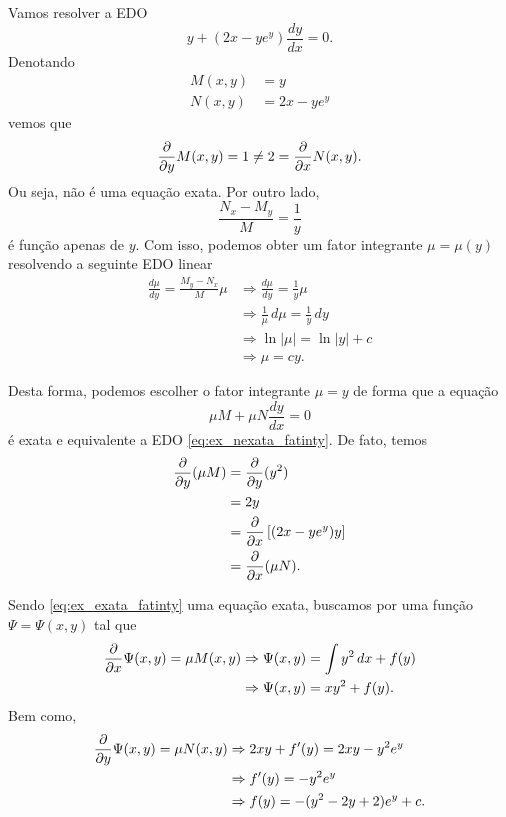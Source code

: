 \begin{ex}
  Vamos resolver a EDO
  \begin{equation}\label{eq:ex_nexata_fatinty}
    y + (2x - ye^y)\frac{dy}{dx} = 0.
  \end{equation}
  Denotando
  \begin{align}
    M(x,y) &= y \\
    N(x,y) &= 2x - ye^y
  \end{align}
  vemos que
  \begin{equation}
    \frac{\partial}{\partial y}M(x,y) = 1 \neq 2 = \frac{\partial}{\partial x}N(x,y).
  \end{equation}
  Ou seja, não é uma equação exata. Por outro lado,
  \begin{equation}
    \frac{N_x-M_y}{M} = \frac{1}{y}
  \end{equation}
  é função apenas de $y$. Com isso, podemos obter um fator integrante $\mu = \mu(y)$ resolvendo a seguinte EDO linear
  \begin{align}
    \frac{d\mu}{dy} = \frac{M_y-N_x}{M}\mu &\Rightarrow \frac{d\mu}{dy} = \frac{1}{y}\mu \\
    &\Rightarrow \frac{1}{\mu}\,d\mu = \frac{1}{y}\,dy \\
    &\Rightarrow \ln|\mu| = \ln|y| + c \\
    &\Rightarrow \mu = cy.
  \end{align}

  Desta forma, podemos escolher o fator integrante $\mu = y$ de forma que a equação
  \begin{equation}\label{eq:ex_exata_fatinty}
    \mu M + \mu N\frac{dy}{dx} = 0
  \end{equation}
  é exata e equivalente a EDO \eqref{eq:ex_nexata_fatinty}. De fato, temos
  \begin{align}
    \frac{\partial}{\partial y}(\mu M) &= \frac{\partial}{\partial y}(y^2) \\
                           &= 2y \\
                           &= \frac{\partial}{\partial x}\left[(2x-ye^y)y\right] \\
                           &= \frac{\partial}{\partial x}(\mu N).
  \end{align}
  
  Sendo \eqref{eq:ex_exata_fatinty} uma equação exata, buscamos por uma função $\Psi = \Psi(x,y)$ tal que
  \begin{align}
    \frac{\partial}{\partial x}\Psi(x,y) = \mu M(x,y) &\Rightarrow \Psi(x,y) = \int y^2\,dx + f(y) \\
                                          &\Rightarrow \Psi(x,y) = xy^2 + f(y).
  \end{align}
  Bem como,
  \begin{align}
    \frac{\partial}{\partial y}\Psi(x,y) = \mu N(x,y) &\Rightarrow 2xy + f'(y) = 2xy - y^2e^{y} \\
                                          &\Rightarrow f'(y) = -y^2e^{y} \\
                                          &\Rightarrow f(y) = -(y^2-2y+2)e^y + c.
  \end{align}


\end{ex}
